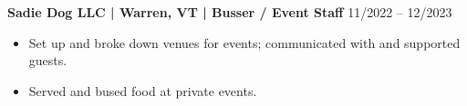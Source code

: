 \noindent
\textbf{Sadie Dog LLC | Warren, VT | Busser / Event Staff} \hfill 11/2022 -- 12/2023
\begin{itemize}
    \item Set up and broke down venues for events; communicated with and supported guests.
    \item Served and bused food at private events.
\end{itemize}
